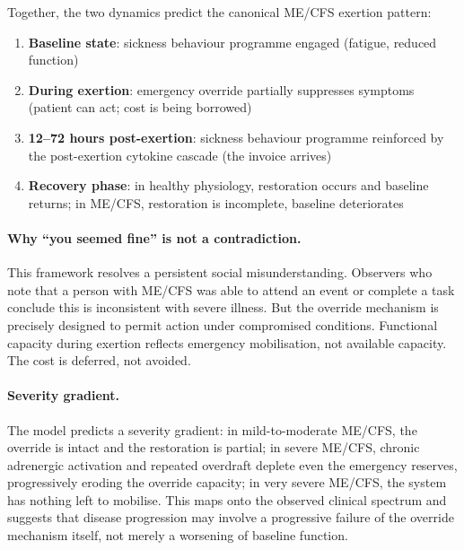 \begin{speculation}
Together, the two dynamics predict the canonical ME/CFS exertion pattern:
\begin{enumerate}
  \item \textbf{Baseline state}: sickness behaviour programme engaged (fatigue, reduced function)
  \item \textbf{During exertion}: emergency override partially suppresses symptoms (patient
    can act; cost is being borrowed)
  \item \textbf{12--72 hours post-exertion}: sickness behaviour programme reinforced by the
    post-exertion cytokine cascade (the invoice arrives)
  \item \textbf{Recovery phase}: in healthy physiology, restoration occurs and baseline
    returns; in ME/CFS, restoration is incomplete, baseline deteriorates
\end{enumerate}

\paragraph{Why ``you seemed fine'' is not a contradiction.}
This framework resolves a persistent social misunderstanding. Observers who note that a
person with ME/CFS was able to attend an event or complete a task conclude this is
inconsistent with severe illness. But the override mechanism is precisely designed to
permit action under compromised conditions. Functional capacity during exertion reflects
emergency mobilisation, not available capacity. The cost is deferred, not avoided.

\paragraph{Severity gradient.}
The model predicts a severity gradient: in mild-to-moderate ME/CFS, the override is
intact and the restoration is partial; in severe ME/CFS, chronic adrenergic activation
and repeated overdraft deplete even the emergency reserves, progressively eroding the
override capacity; in very severe ME/CFS, the system has nothing left to mobilise.
This maps onto the observed clinical spectrum and suggests that disease progression may
involve a progressive failure of the override mechanism itself, not merely a worsening
of baseline function.


\end{speculation}
